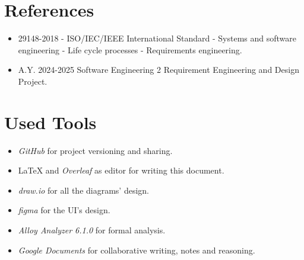 \section{References}
\label{sec:references}%

\begin{itemize}
    \item 29148-2018 - ISO/IEC/IEEE International Standard - Systems and software engineering - Life cycle processes - Requirements engineering.
    \item A.Y. 2024-2025 Software Engineering 2 Requirement Engineering and Design Project.
\end{itemize}

\section{Used Tools}
\label{sec:used_tools}%
\begin{itemize}
    \item \textit{GitHub} for project versioning and sharing.
    \item \LaTeX{} and \textit{Overleaf} as editor for writing this document.
    \item \textit{draw.io} for all the diagrams' design.
    \item \textit{figma} for the UI's design.
    \item \textit{Alloy Analyzer 6.1.0} for formal analysis.
    \item \textit{Google Documents} for collaborative writing, notes and reasoning.
\end{itemize}